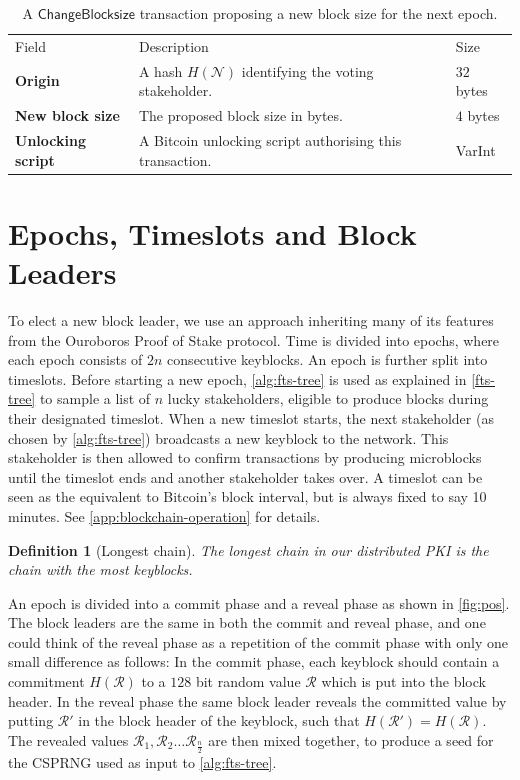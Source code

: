 \documentclass{style/kththesis}
\newtheorem{definition}{Definition}
\begin{document}
\begin{table}
\caption{A $\mathsf{ChangeBlocksize}$ transaction proposing a new block size for the next epoch.}
\label{tab:change-blocksize}
\begin{tabularx}{\textwidth}{lXl}
\cmidrule(r){1-3}
Field & Description & Size \\ 
\cmidrule(r){1-3}
\textbf{Origin} & A hash $H(\mathcal{N})$ identifying the voting stakeholder. & $32$ bytes \\
\textbf{New block size} & The proposed block size in bytes. & $4$ bytes \\
\textbf{Unlocking script} & A Bitcoin unlocking script authorising this transaction. & VarInt \\
\end{tabularx}
\end{table}

\section{Epochs, Timeslots and Block Leaders}
To elect a new block leader, we use an approach inheriting many of its features from the Ouroboros Proof of Stake protocol. Time is divided into epochs, where each epoch consists of $2n$ consecutive keyblocks. An epoch is further split into timeslots. Before starting a new epoch, \cref{alg:fts-tree} is used as explained in \cref{fts-tree} to sample a list of $n$ lucky stakeholders, eligible to produce blocks during their designated timeslot. When a new timeslot starts, the next stakeholder (as chosen by \cref{alg:fts-tree}) broadcasts a new keyblock to the network. This stakeholder is then allowed to confirm transactions by producing microblocks until the timeslot ends and another stakeholder takes over. A timeslot can be seen as the equivalent to Bitcoin's block interval, but is always fixed to say 10 minutes. See \cref{app:blockchain-operation} for details.

\begin{definition}[Longest chain]
The longest chain in our distributed PKI is the chain with the most keyblocks.
\end{definition}

An epoch is divided into a commit phase and a reveal phase as shown in \cref{fig:pos}. The block leaders are the same in both the commit and reveal phase, and one could think of the reveal phase as a repetition of the commit phase with only one small difference as follows: In the commit phase, each keyblock should contain a commitment $H(\mathcal{R})$ to a $128$ bit random value $\mathcal{R}$ which is put into the block header. In the reveal phase the same block leader reveals the committed value by putting $\mathcal{R'}$ in the block header of the keyblock, such that $H(\mathcal{R'}) = H(\mathcal{R})$. The revealed values $\mathcal{R}_1, \mathcal{R}_2\ldots \mathcal{R}_{\frac{n}{2}}$ are then mixed together, to produce a seed for the CSPRNG used as input to \cref{alg:fts-tree}.
\end{document}
